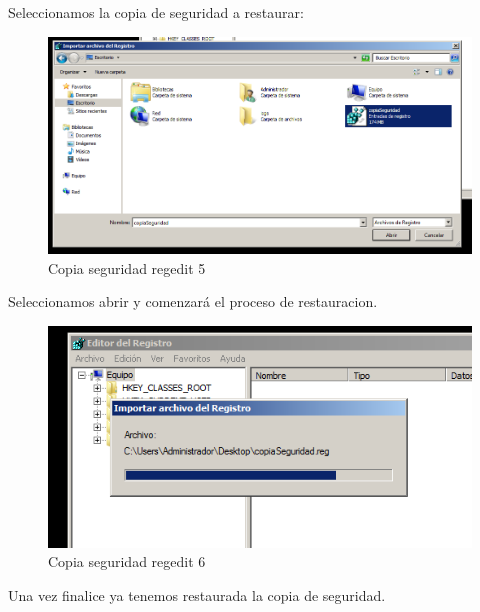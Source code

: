 Seleccionamos la copia de seguridad a restaurar:

\begin{figure}[H] %
	\centering
	\includegraphics[scale=0.5]{pics/reg5}  %
	\caption{Copia seguridad regedit 5} \label{fig:reg5}
\end{figure}

Seleccionamos abrir y comenzará el proceso de restauracion.

\begin{figure}[H] %
	\centering
	\includegraphics[scale=0.5]{pics/reg6}  %
	\caption{Copia seguridad regedit 6} \label{fig:reg6}
\end{figure}

Una vez finalice ya tenemos restaurada la copia de seguridad.



